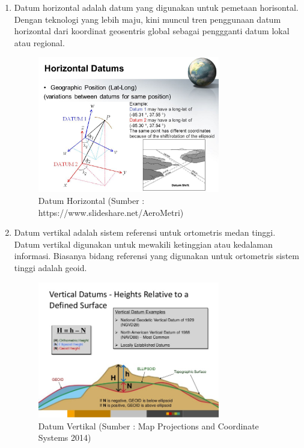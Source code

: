 \begin{enumerate}
\item Datum horizontal adalah datum yang digunakan untuk pemetaan horisontal. Dengan teknologi yang lebih maju, kini muncul tren penggunaan datum horizontal dari koordinat geosentris global sebagai penggganti datum lokal atau regional.
\begin{figure}[htbp]
		\centering
		\includegraphics[width=0.75\textwidth]{pictures/datum_horizontal.jpg}
		\caption{Datum Horizontal (Sumber : https://www.slideshare.net/AeroMetri)}
		\label{Datum Horizontal}
		\end{figure}	

\item Datum vertikal adalah sistem referensi untuk ortometris medan tinggi. Datum vertikal digunakan untuk mewakili ketinggian atau kedalaman informasi. Biasanya bidang referensi yang digunakan untuk ortometris sistem tinggi adalah geoid.
\begin{figure}[htbp]
		\centering
		\includegraphics[width=0.75\textwidth]{pictures/vertical_datum.jpg}
		\caption{Datum Vertikal (Sumber : Map Projections and Coordinate Systems 2014)}
		\label{Datum Vertikal}
		\end{figure}	
\end{enumerate}